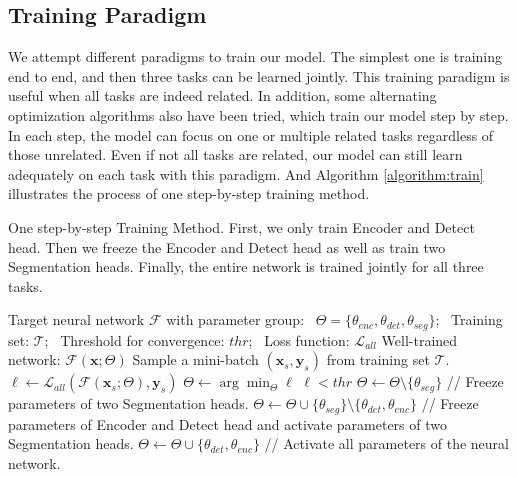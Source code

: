 \documentclass[10pt,twocolumn,letterpaper]{article}
\begin{document}
\subsection{Training Paradigm}

We attempt different paradigms to train our model. The simplest one is training end to end, and then three tasks can be learned jointly. This training paradigm is useful when all tasks are indeed related. In addition, some alternating optimization algorithms also have been tried, which train our model step by step. In each step, the model can focus on one or multiple related tasks regardless of those unrelated. Even if not all tasks are related, our model can still learn adequately on each task with this paradigm. And Algorithm \ref{algorithm:train} illustrates the process of one step-by-step training method.

\begin{algorithm}  
    \caption{One step-by-step Training Method. First, we only train Encoder and Detect head. Then we freeze the Encoder and Detect head as well as train two Segmentation heads. Finally, the entire network is trained jointly for all three tasks.} 
    \label{algorithm:train}
    \begin{algorithmic}[1] \Require Target neural network $\mathcal{F}$ with parameter group:
        \Statex \quad \, $\Theta=\{\theta_{enc}, \theta_{det}, \theta_{seg}\}$;
        \Statex \quad \, Training set: $\mathcal T$;
        \Statex \quad \, Threshold for convergence: $thr$;
        \Statex \quad \, Loss function: $\mathcal L_{all}$
        \Ensure Well-trained network: $\mathcal{F}(\mathbf x;\Theta)$
            \Repeat
                \State Sample a mini-batch $(\mathbf x_s, \mathbf y_s)$ from training set $\mathcal T$.
                \State $\ell \leftarrow \mathcal L_{all}(\mathcal F(\mathbf x_s;\Theta), \mathbf y_s)$
                \State $\Theta \leftarrow \arg \min_{\Theta} \ell$
            \Until $\ell < thr$
        \EndProcedure
        \State $\Theta \leftarrow \Theta \setminus \{\theta_{seg}\}$ // Freeze parameters of two Segmentation heads.
        \State {}
        \State $\Theta \leftarrow \Theta \cup \{\theta_{seg}\} \setminus \{\theta_{det}, \theta_{enc}\}$ // Freeze parameters of Encoder and Detect head and activate parameters of two Segmentation heads.
        \State {}
        \State $\Theta \leftarrow \Theta \cup \{\theta_{det}, \theta_{enc}\}$ // Activate all parameters of the neural network.
        \State {}
        \State {}
    \end{algorithmic}
\end{algorithm}
\end{document}
